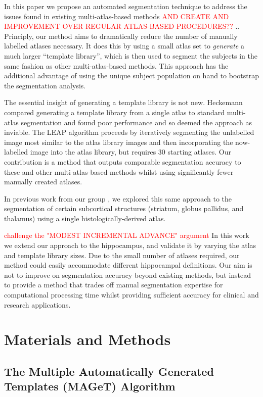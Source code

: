 \documentclass{article}
\newcommand{\todo}[1]{
    \textcolor{red}{#1}
}
\begin{document}
In this paper we propose an automated segmentation technique to address the
issues found in existing multi-atlas-based methods  \todo{AND CREATE AND
IMPROVEMENT OVER REGULAR ATLAS-BASED PROCEDURES??}.. Principly, our method
aims to dramatically reduce the number of manually labelled atlases
necessary.  It does this by using a small atlas set to {\it generate} a
much larger ``template library'', which is then used to segment the
subjects in the same fashion as other multi-atlas-based methods.  This
approach has the additional advantage of using the unique subject
population on hand to bootstrap the segmentation analysis.  

The essential insight of generating a template library is not new.
Heckemann \cite{Heckemann2006} compared generating a template library from
a single atlas to standard multi-atlas segmentation and found poor
performance and so deemed the approach as inviable.  The LEAP algorithm
\cite{Wolz2010} proceeds by iteratively segmenting the unlabelled image
most similar to the atlas library images and then incorporating the
now-labelled image into the atlas library, but requires 30 starting
atlases.  Our contribution is a method that outputs comparable segmentation
accuracy to these and other multi-atlas-based methods whilst using
significantly fewer manually created atlases.

In previous work from our group \cite{Chakravarty2011}, we explored
this same approach to the segmentation of certain subcortical structures (striatum,
globus pallidus, and thalamus) using a single histologically-derived atlas.
\todo{challenge the "MODEST INCREMENTAL ADVANCE" argument} In this work we
extend our approach to the hippocampus, and validate it by varying the
atlas and template library sizes.  Due to the small number of atlases
required, our method could easily accommodate different hippocampal
definitions.  Our aim is not to improve on segmentation accuracy beyond
existing methods, but instead to provide a method that trades off manual
segmentation expertise for computational processing time whilst providing
sufficient accuracy for clinical and research applications.

\section{Materials and Methods} 
\subsection{The Multiple Automatically Generated Templates (MAGeT) Algorithm}
\end{document}
